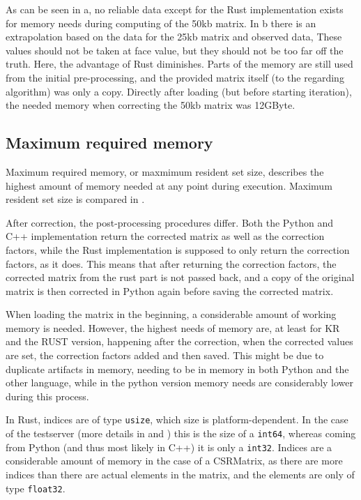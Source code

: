 As can be seen in a, no reliable data except for the Rust
implementation exists for memory needs during computing of the 50kb matrix. In
b there is an extrapolation based on the data for the
25kb matrix and observed data, These values should not be taken at face value,
but they should not be too far off the truth. Here, the advantage of Rust
diminishes. Parts of the memory are still used from the initial pre-processing,
and the provided matrix itself (to the regarding algorithm) was only a copy.
Directly after loading (but before starting iteration), the needed memory when
correcting the 50kb matrix was 12GByte.


\subsection{Maximum required memory}\label{sec:maxmem}



Maximum required memory, or maxmimum resident set size, describes the highest
amount of memory needed at any point during execution. Maximum resident set size
is compared in .

After correction, the post-processing procedures differ. Both the Python and
C++ implementation return the corrected matrix as well as the correction
factors, while the Rust implementation is supposed to only return the
correction factors, as it does. This means that after returning the correction
factors, the corrected matrix from the rust part is not passed back, and a copy
of the original matrix is then corrected in Python again before saving the
corrected matrix.

When loading the matrix in the beginning, a considerable amount of working
memory is needed. However, the highest needs of memory are, at least for KR and
the RUST version, happening after the correction, when the corrected values are
set, the correction factors added and then saved. This might be due to
duplicate artifacts in memory, needing to be in memory in both Python and
the other language, while in the python version memory needs are considerably
lower during this process.

In Rust, indices are of type \verb|usize|, which size is platform-dependent. In
the case of the testserver (more details in  and
) this is the size of a \verb|int64|, whereas coming from
Python (and thus most likely in C++) it is only a \verb|int32|. Indices are a
considerable amount of memory in the case of a CSRMatrix, as there are more
indices than there are actual elements in the matrix, and the elements are only
of type \verb|float32|.

